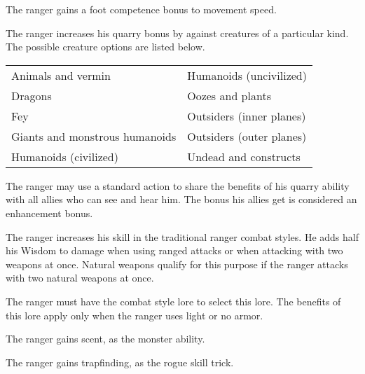  The ranger gains a  foot competence bonus to movement speed.

 The ranger increases his quarry bonus by  against creatures of a particular kind. The possible creature options are listed below.

\begin{dtable}
\begin{tabularx}{\columnwidth}{X X}
Animals and vermin & Humanoids (uncivilized) \\
Dragons & Oozes and plants \\
Fey & Outsiders (inner planes) \\
Giants and monstrous humanoids & Outsiders (outer planes) \\
Humanoids (civilized)  & Undead and constructs \\
\end{tabularx}
\end{dtable}

 The ranger may use a standard action to share the benefits of his quarry ability with all allies who can see and hear him. The bonus his allies get is considered an enhancement bonus.

 The ranger increases his skill in the traditional ranger combat styles. He adds half his Wisdom to damage when using ranged attacks or when attacking with two weapons at once. Natural weapons qualify for this purpose if the ranger attacks with two natural weapons at once.

The ranger must have the combat style lore to select this lore. The benefits of this lore apply only when the ranger uses light or no armor.

 The ranger gains scent, as the monster ability.

 The ranger gains trapfinding, as the rogue skill trick.

\begin{comment}
\cf{Rgr}{Animal Companion (Ex)}:  At 4th level, a ranger gains an animal
companion selected from the following list: badger, camel, dire rat,
dog, riding dog, eagle, hawk, horse (light or heavy), owl, pony, snake
(Small or Medium viper), or wolf. If the campaign takes place
wholly or partly in an aquatic environment, the following creatures may be added
to the ranger's list of options: crocodile,
porpoise, Medium shark, and squid. This animal is a loyal
companion that accompanies the ranger on his adventures as
appropriate for its kind.

\par This ability functions like the druid ability of the same name (see \pref{Drd:Animal Companion (Ex)}), except that the ranger's effective druid level is equal to his ranger level \sub 3.
\par For example, the animal companion of an 8th-level
ranger would be the equivalent of a 5th-level druid's animal
companion.
\end{comment}

